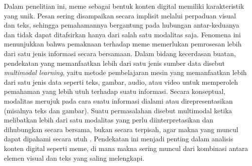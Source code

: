 

Dalam penelitian ini, meme sebagai bentuk konten digital memiliki karakteristik yang unik. Pesan sering disampaikan secara implisit melalui perpaduan visual dan teks, sehingga pemahamannya bergantung pada hubungan antar-keduanya dan tidak dapat ditafsirkan hanya dari salah satu modalitas saja. Fenomena ini menunjukkan bahwa pemaknaan terhadap meme memerlukan pemrosesan lebih dari satu jenis informasi secara bersamaan. Dalam bidang kecerdasan buatan, pendekatan yang memanfaatkan lebih dari satu jenis sumber data disebut \textit{multimodal learning}, yaitu metode pembelajaran mesin yang memanfaatkan lebih dari satu jenis data seperti teks, gambar, audio, atau video untuk memperoleh pemahaman yang lebih utuh terhadap suatu informasi. Secara konseptual, modalitas merujuk pada cara suatu informasi dialami atau direpresentasikan (misalnya teks dan gambar). Suatu permasalahan disebut multimodal ketika melibatkan lebih dari satu modalitas yang perlu diinterpretasikan dan dihubungkan secara bersama, bukan secara terpisah, agar makna yang muncul dapat dipahami secara utuh \cite{baltrusaitis2018multimodal}. Pendekatan ini menjadi penting dalam analisis konten digital seperti meme, di mana makna sering muncul dari kombinasi antara elemen visual dan teks yang saling melengkapi. 

